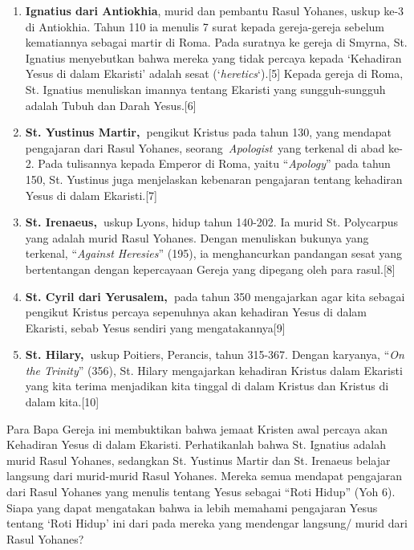 \begin{enumerate}
\item \textbf{Ignatius dari Antiokhia}, murid dan pembantu Rasul
Yohanes, uskup ke-3 di Antiokhia. Tahun 110 ia menulis 7 surat kepada
gereja-gereja sebelum kematiannya sebagai martir di Roma. Pada suratnya
ke gereja di Smyrna, St. Ignatius menyebutkan bahwa mereka yang tidak
percaya kepada {\textquoteleft}Kehadiran Yesus di dalam
Ekaristi{\textquoteright} adalah sesat
({\textquoteleft}\emph{heretics}{\textquoteleft}).[5] Kepada gereja di
Roma, St. Ignatius menuliskan imannya tentang Ekaristi yang
sungguh-sungguh adalah Tubuh dan Darah Yesus.[6]
\item \textbf{St. Yustinus Martir,~}pengikut Kristus pada tahun 130,
yang mendapat pengajaran dari Rasul Yohanes,
seorang~\emph{Apologist}~yang terkenal di abad ke-2. Pada tulisannya
kepada Emperor di Roma, yaitu
{\textquotedblleft}\emph{Apology}{\textquotedblright} pada tahun 150,
St. Yustinus juga menjelaskan kebenaran pengajaran tentang kehadiran
Yesus di dalam Ekaristi.[7]
\item \textbf{St. Irenaeus,~}uskup Lyons, hidup tahun 140-202. Ia murid
St. Polycarpus yang adalah murid Rasul Yohanes. Dengan menuliskan
bukunya yang terkenal, {\textquotedblleft}\emph{Against
Heresies}{\textquotedblright} (195), ia menghancurkan pandangan sesat
yang bertentangan dengan kepercayaan Gereja yang dipegang oleh para
rasul.[8]
\item \textbf{St. Cyril dari Yerusalem,~}pada tahun 350 mengajarkan agar
kita sebagai pengikut Kristus percaya sepenuhnya akan kehadiran Yesus
di dalam Ekaristi, sebab Yesus sendiri yang mengatakannya[9]
\item \textbf{St. Hilary,~}uskup Poitiers, Perancis, tahun 315-367.
Dengan karyanya, {\textquotedblleft}\emph{On the
Trinity}{\textquotedblright} (356), St. Hilary mengajarkan kehadiran
Kristus dalam Ekaristi yang kita terima menjadikan kita tinggal di
dalam Kristus dan Kristus di dalam kita.[10]
\end{enumerate}
Para Bapa Gereja ini membuktikan bahwa jemaat Kristen awal percaya akan
Kehadiran Yesus di dalam Ekaristi. Perhatikanlah bahwa St. Ignatius
adalah murid Rasul Yohanes, sedangkan St. Yustinus Martir dan St.
Irenaeus belajar langsung dari murid-murid Rasul Yohanes. Mereka semua
mendapat pengajaran dari Rasul Yohanes yang menulis tentang Yesus
sebagai {\textquotedblleft}Roti Hidup{\textquotedblright} (Yoh 6).
Siapa yang dapat mengatakan bahwa ia lebih memahami pengajaran Yesus
tentang {\textquoteleft}Roti Hidup{\textquoteright} ini dari pada
mereka yang mendengar langsung/ murid dari Rasul Yohanes?

